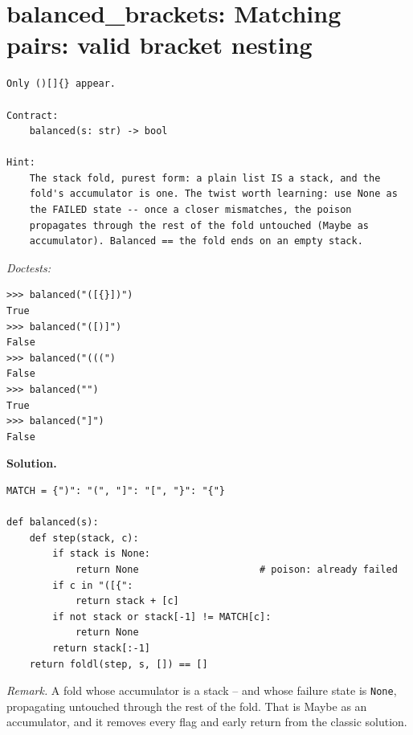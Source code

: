 \documentclass[11pt,letterpaper]{book}
\begin{document}
\section{balanced\_brackets: Matching pairs: valid bracket nesting}
\begin{lstlisting}[style=spec]
Only ()[]{} appear.

Contract:
    balanced(s: str) -> bool

Hint:
    The stack fold, purest form: a plain list IS a stack, and the
    fold's accumulator is one. The twist worth learning: use None as
    the FAILED state -- once a closer mismatches, the poison
    propagates through the rest of the fold untouched (Maybe as
    accumulator). Balanced == the fold ends on an empty stack.
\end{lstlisting}
\noindent\textit{Doctests:}
\begin{lstlisting}[style=spec]
>>> balanced("([{}])")
True
>>> balanced("([)]")
False
>>> balanced("(((")
False
>>> balanced("")
True
>>> balanced("]")
False
\end{lstlisting}
\noindent\textbf{Solution.}
\begin{lstlisting}[style=code]
MATCH = {")": "(", "]": "[", "}": "{"}

def balanced(s):
    def step(stack, c):
        if stack is None:
            return None                     # poison: already failed
        if c in "([{":
            return stack + [c]
        if not stack or stack[-1] != MATCH[c]:
            return None
        return stack[:-1]
    return foldl(step, s, []) == []
\end{lstlisting}

\noindent\textit{Remark.} A fold whose accumulator is a stack -- and whose
failure state is \texttt{None}, propagating untouched through the rest of the
fold. That is Maybe as an accumulator, and it removes every flag and early
return from the classic solution.
\end{document}
